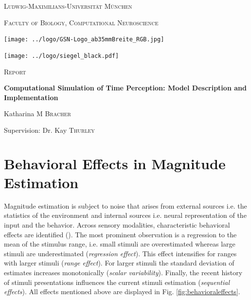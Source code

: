 \documentclass[10pt]{article}
\begin{document}
\begin{titlepage}
	\centering
	{\scshape\LARGE Ludwig-Maximilians-Universität München \par}
	{\scshape\large Faculty of Biology, Computational Neuroscience \par}
	\vspace{0.5cm}
	\texttt{[image: ../logo/GSN-Logo\_ab35mmBreite\_RGB.jpg]}\par
	\texttt{[image: ../logo/siegel\_black.pdf]}\par
	\vspace{0.7cm}
	{\scshape\LARGE Report \par}
	\vspace{0.05cm}
	\vspace{0.05cm}
	{\huge\bfseries Computational Simulation of Time Perception: Model Description and Implementation \par}
	\vspace{1.5cm}
	{\Large Katharina \textsc{M Bracher} \par}
	\vspace{0.4cm}
	{\large Supervision: Dr. Kay \textsc{Thurley} \par}
\end{titlepage}


\normalsize
\tableofcontents
\pagebreak


\section{Behavioral Effects in Magnitude Estimation}
Magnitude estimation is subject to noise that arises from external sources i.e. the statistics of the environment and internal sources i.e. neural representation of the input and the behavior.
Across sensory modalities, characteristic behavioral effects are identified (\cite{Petzschner2015}).
The most prominent observation is a regression to the mean of the stimulus range,  i.e. small stimuli are overestimated whereas large stimuli are underestimated (\textit{regression effect}). 
This effect intensifies for ranges with larger stimuli (\textit{range effect}).
For larger stimuli the standard deviation of estimates increases monotonically (\textit{scalar variability}). 
Finally, the recent history of stimuli presentations influences the current stimuli estimation (\textit{sequential effects}).
All effects mentioned above are displayed in Fig. \ref{fig:behavioraleffects}. 
\end{document}
